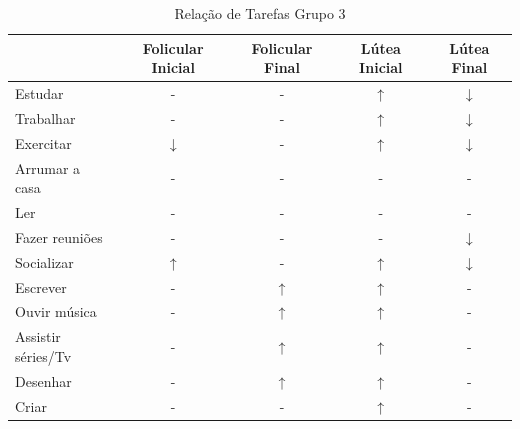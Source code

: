         \begin{table}[]
            \centering
            \caption{Relação de Tarefas Grupo 3}
            \label{tab13}
            \begin{tabular}{|l|c|c|c|c|}
            \hline
            \rowcolor[HTML]{C0C0C0} 
            \multicolumn{1}{|c|}{\cellcolor[HTML]{C0C0C0}Tarefas recomendadas}  & Folicular Inicial & Folicular Final  & Lútea Inicial& Lútea Final \\ \hline
            Estudar & -  & - & $\uparrow$ & $\downarrow$ \\ \hline
            \rowcolor[HTML]{EFEFEF} 
            Trabalhar & - & -  & $\uparrow$ &  $\downarrow$  \\ \hline
            Exercitar & $\downarrow$ & -& $\uparrow$ &  $\downarrow$  \\ \hline
            \rowcolor[HTML]{EFEFEF} 
            Arrumar a casa  & - & -  & - & - \\ \hline
            Ler & - & -  & - & - \\ \hline
            \rowcolor[HTML]{EFEFEF} 
            Fazer reuniões & - & - & -& $\downarrow$ \\ \hline
            \rowcolor[HTML]{EFEFEF} 
            Socializar & $\uparrow$ & -  & $\uparrow$ & $\downarrow$ \\ \hline
            \rowcolor[HTML]{EFEFEF} 
            Escrever & - & $\uparrow$  & $\uparrow$ & - \\ \hline
            Ouvir música & - & $\uparrow$  & $\uparrow$  & -\\ \hline
            \rowcolor[HTML]{EFEFEF} 
            Assistir séries/Tv & - &  $\uparrow$ &  $\uparrow$ & - \\ \hline
            Desenhar & -  & $\uparrow$  & $\uparrow$ & - \\ \hline
            \rowcolor[HTML]{EFEFEF} 
            Criar & - &  -  &  $\uparrow$ & - \\ \hline
            \end{tabular}
            \end{table}

